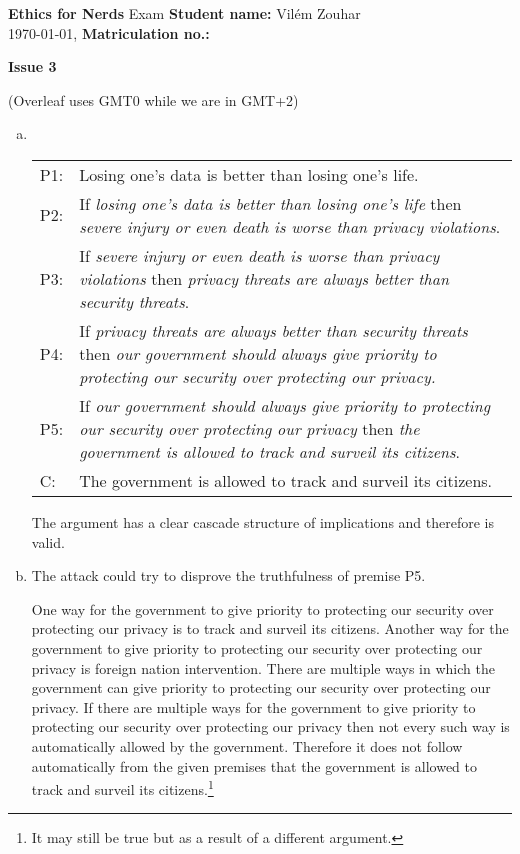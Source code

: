 \documentclass[a4paper, 11pt]{article}
\newcommand{\stdn}{} \newcommand{\studentname}[1]{\renewcommand{\stdn}{#1}}
\newcommand{\mtrk}{} \newcommand{\matriculationno}[1]{\renewcommand{\mtrk}{#1}}
\newcommand{\isnr}{} \newcommand{\issuenumber}[1]{\renewcommand{\isnr}{#1}}
\newcommand{\makeheader}{\textbf{Ethics for Nerds} Exam \hfill \textbf{Student name:} \stdn \\ \today, \currenttime \hfill \textbf{Matriculation no.:} \mtrk \par \textbf{\Large Issue \isnr}}
\begin{document}
\sffamily


\studentname{Vilém Zouhar} %
\matriculationno{} %
\issuenumber{3} %
\makeheader %


(Overleaf uses GMT0 while we are in GMT+2)

\begin{enumerate}[a)]
    \item
    \, \vspace{-0.65cm}
    
    \begin{tabular}{lp{12cm}}
    P1: & Losing one's data is better than losing one's life.\\
    P2: & If \emph{losing one's data is better than losing one's life} then \emph{severe injury or even death is worse than privacy violations}. \\
    P3: & If \emph{severe injury or even death is worse than privacy violations} then \emph{privacy threats are always better than security threats}. \\
    P4: & If \emph{privacy threats are always better than security threats} then \emph{our government should always give priority to protecting our security over protecting our privacy.} \\
    P5: & If \emph{our government should always give priority to protecting our security over protecting our privacy} then \emph{the government is allowed to track and surveil its citizens}.\\
    \hline
    C: & The government is allowed to track and surveil its citizens.
    \end{tabular}
    
    The argument has a clear cascade structure of implications and therefore is valid.
    
    \item
    The attack could try to disprove the truthfulness of premise P5.

    One way for the government to give priority to protecting our security over protecting our privacy is to track and surveil its citizens.
    Another way for the government to give priority to protecting our security over protecting our privacy is foreign nation intervention.
    There are multiple ways in which the government can give priority to protecting our security over protecting our privacy.
    If there are multiple ways for the government to give priority to protecting our security over protecting our privacy then not every such way is automatically allowed by the government.
    Therefore it does not follow automatically from the given premises that the government is allowed to track and surveil its citizens.\footnote{It may still be true but as a result of a different argument.}
    

\end{enumerate}
\end{document}

